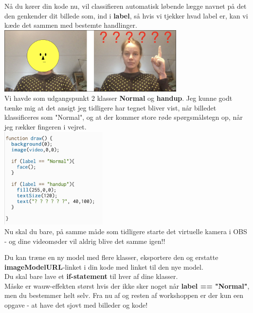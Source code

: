 \documentclass{ucph-handout}
\begin{document}
\newpage
\begin{exercisebox}[adjusted title=Tjek betingelse med \textit{if-statement}]

Nå du kører din kode nu, vil classifieren automatisk løbende lægge navnet på det den genkender dit billede som, ind i \textbf{label}, så hvis vi tjekker hvad label er, kan vi kæde det sammen med bestemte handlinger. \\

\includegraphics[width=0.7\textwidth]{nyebilleder/to.jpg} \\

Vi havde som udgangspunkt 2 klasser \textbf{Normal} og \textbf{handup}. Jeg kunne godt tænke mig at det ansigt jeg tidligere har tegnet bliver vist, når billedet klassificeres som "Normal", og at der kommer store røde spørgsmålstegn op, når jeg rækker fingeren i vejret. \\

\includegraphics[width=0.4\textwidth]{nyebilleder/nukode.png} \\

Nu skal du bare, på samme måde som tidligere starte det virtuelle kamera i OBS - og dine videomøder vil aldrig blive det samme igen!! 

Du kan træne en ny model med flere klasser, eksportere den og erstatte \\ \textbf{imageModelURL}-linket i din kode med linket til den nye model.  \\
Du skal bare lave et \textbf{if-statement} til hver af dine klasser.\\

Måske er wauw-effekten størst hvis der ikke sker noget når \textbf{label == "Normal"}, men du bestemmer helt selv. Fra nu af og resten af workshoppen er der kun een opgave - at have det sjovt med billeder og kode!  \\


\end{exercisebox}
\end{document}
